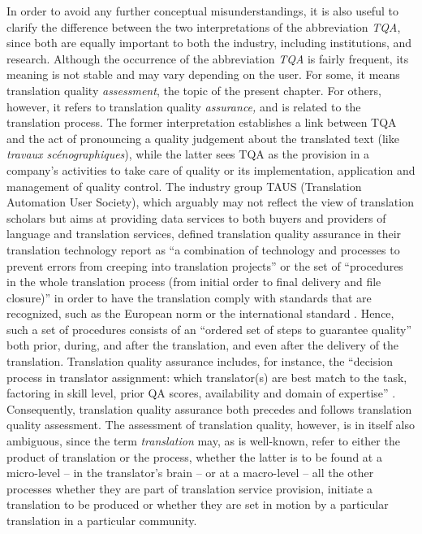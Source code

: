 \documentclass[output=paper]{langsci/langscibook}
\begin{document}
In order to avoid any further conceptual misunderstandings, it is also useful to clarify the difference between the two interpretations of the abbreviation \textit{TQA}, since both are equally important to both the industry, including institutions, and research. Although the occurrence of the abbreviation \textit{TQA} is fairly frequent, its meaning is not stable and may vary depending on the user. For some, it means translation quality \textit{assessment}, the topic of the present chapter. For others, however, it refers to translation quality \textit{assurance,} and is related to the translation process. The former interpretation establishes a link between TQA and the act of pronouncing a quality judgement about the translated text (like \textit{travaux scénographiques}), while the latter sees TQA as the provision in a company’s activities to take care of quality or its implementation, application and management of quality control. The industry group TAUS (Translation Automation User Society), which arguably may not reflect the view of translation scholars but aims at providing data services to both buyers and providers of language and translation services, defined translation quality assurance in their translation technology report as “a combination of technology and processes to prevent errors from creeping into translation projects” or the set of ``procedures in the whole translation process (from initial order to final delivery and file closure)'' \citep[22]{TAUS2013} in order to have the translation comply with standards that are recognized, such as the European norm \citet{EN2006} or the international standard \citet{ISO2015}. Hence, such a set of procedures consists of an ``ordered set of steps to guarantee quality'' \citep[22]{TAUS2013} both prior, during, and after the translation, and even after the delivery of the translation. Translation quality assurance includes, for instance, the ``decision process in translator assignment: which translator(s) are best match to the task, factoring in skill level, prior QA scores, availability and domain of expertise'' \citep[22]{TAUS2013}. Consequently, translation quality assurance both precedes and follows translation quality assessment. The assessment of translation quality, however, is in itself also ambiguous, since the term \textit{translation} may, as is well-known, refer to either the product of translation or the process, whether the latter is to be found at a micro-level – in the translator's brain – or at a macro-level – all the other processes whether they are part of translation service provision, initiate a translation to be produced or whether they are set in motion by a particular translation in a particular community. 
\end{document}
